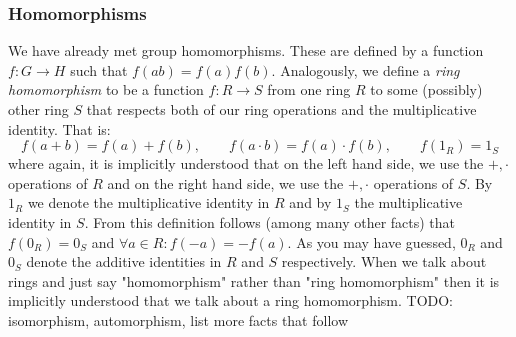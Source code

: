 


\subsubsection{Homomorphisms}
We have already met group homomorphisms. These are defined by a function $f: G \rightarrow H$ such that $f(a b) = f(a) f(b)$. Analogously, we define a \emph{ring homomorphism} to be a function $f: R \rightarrow  S$ from one ring $R$ to some (possibly) other ring $S$ that respects both of our ring operations and the multiplicative identity. That is:
\begin{equation}
  f(a   +   b) = f(a)   +   f(b), \qquad
  f(a \cdot b) = f(a) \cdot f(b), \qquad
  f(1_R) = 1_S
\end{equation}
where again, it is implicitly understood that on the left hand side, we use the $+,\cdot$ operations of $R$ and on the right hand side, we use the $+,\cdot$ operations of $S$. By $1_R$ we denote the multiplicative identity in $R$ and by $1_S$ the multiplicative identity in $S$. From this definition follows (among many other facts) that $f(0_R) = 0_S$ and $\forall a \in R: f(-a) = -f(a)$. As you may have guessed, $0_R$ and $0_S$ denote the additive identities in $R$ and $S$ respectively. When we talk about rings and just say "homomorphism" rather than "ring homomorphism" then it is implicitly understood that we talk about a ring homomorphism. TODO: isomorphism, automorphism, list more facts that follow 

